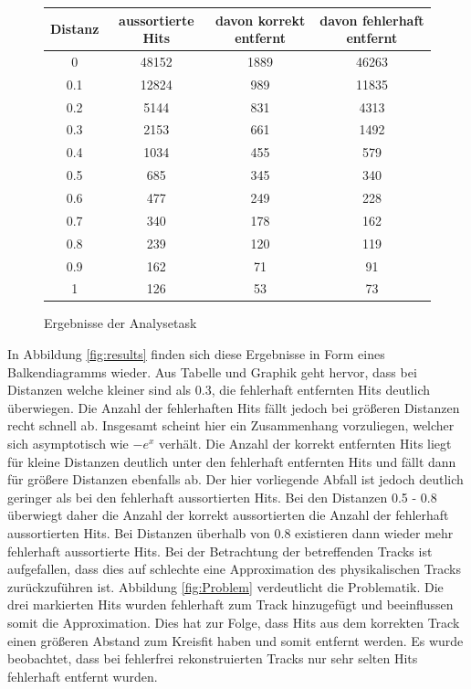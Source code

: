 \begin{figure}
\begin{center}
\begin{tabular}{ |c|c|c|c|}
	\hline
	Distanz & aussortierte Hits & davon korrekt entfernt & davon fehlerhaft entfernt\\
	\hline
0	&   48152 &1889 & 46263\\
0.1	&	12824 & 989	& 11835\\
0.2	&	5144	  & 831	& 4313\\
0.3	&	2153	  & 661	& 1492\\
0.4	&	1034  &	455	& 579\\
0.5	&	685	  & 345	& 340\\
0.6	&	477	  & 249	& 228\\
0.7	&	340	  & 178	& 162\\
0.8	&	239   & 	120	& 119\\
0.9	&	162	  & 71	& 91\\
1	&	126   & 	53	& 73\\
	\hline
\end{tabular}
\end{center}
\caption{Ergebnisse der Analysetask}
\label{tab: results}
\end{figure}

In Abbildung \ref{fig:results} finden sich diese Ergebnisse in Form eines Balkendiagramms wieder. Aus Tabelle und Graphik geht hervor, dass bei Distanzen welche kleiner sind als 0.3, die fehlerhaft entfernten Hits deutlich überwiegen. Die Anzahl der fehlerhaften Hits fällt jedoch bei größeren Distanzen recht schnell ab. Insgesamt scheint hier ein Zusammenhang vorzuliegen, welcher sich asymptotisch wie $-e^x$ verhält. Die Anzahl der korrekt entfernten Hits liegt für kleine Distanzen deutlich unter den fehlerhaft entfernten Hits und fällt dann für größere Distanzen ebenfalls ab. Der hier vorliegende Abfall ist jedoch deutlich geringer als bei den fehlerhaft aussortierten Hits. Bei den Distanzen 0.5 - 0.8 überwiegt daher die Anzahl der korrekt aussortierten die Anzahl der fehlerhaft aussortierten Hits. Bei Distanzen überhalb von 0.8 existieren dann wieder mehr fehlerhaft aussortierte Hits. Bei der Betrachtung der betreffenden Tracks ist aufgefallen, dass dies auf schlechte eine Approximation des physikalischen Tracks zurückzuführen ist. Abbildung \ref{fig:Problem} verdeutlicht die Problematik. Die drei markierten Hits wurden fehlerhaft zum Track hinzugefügt und beeinflussen somit die Approximation. Dies hat zur Folge, dass Hits aus dem korrekten Track einen größeren Abstand zum Kreisfit haben und somit entfernt werden. Es wurde beobachtet, dass bei fehlerfrei rekonstruierten Tracks nur sehr selten Hits fehlerhaft entfernt wurden.

